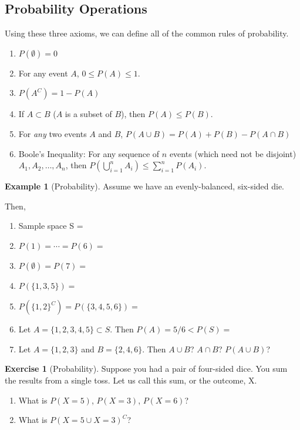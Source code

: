 \documentclass[
]{book}
\providecommand{\tightlist}{%
  \setlength{\itemsep}{0pt}\setlength{\parskip}{0pt}}
\theoremstyle{definition}
\theoremstyle{definition}
\newtheorem{example}{Example}[chapter]
\theoremstyle{definition}
\newtheorem{exercise}{Exercise}[chapter]
\theoremstyle{definition}
\theoremstyle{remark}
\begin{document}
\hypertarget{probability-operations}{%
\subsection*{Probability Operations}\label{probability-operations}}

Using these three axioms, we can define all of the common rules of probability.

\begin{enumerate}
\def\labelenumi{\arabic{enumi}.}
\tightlist
\item
  \(P(\emptyset)=0\)
\item
  For any event \(A\), \(0\le P(A) \le 1\).
\item
  \(P({A}^C)=1-P(A)\)
\item
  If \(A\subset B\) (\(A\) is a subset of \(B\)), then \(P(A)\le P(B)\).
\item
  For \emph{any} two events \(A\) and \(B\), \(P(A\cup B)=P(A)+P(B)-P(A\cap B)\)
\item
  Boole's Inequality: For any sequence of \(n\) events (which need not be disjoint) \(A_1,A_2,\ldots,A_n\), then \(P\left( \bigcup\limits_{i=1}^n A_i\right) \leq \sum\limits_{i=1}^n P(A_i)\).
\end{enumerate}

\begin{example}[Probability]
\protect\hypertarget{exm:prob}{}{\label{exm:prob} {} }
Assume we have an evenly-balanced, six-sided die.

Then,

\begin{enumerate}
\def\labelenumi{\arabic{enumi}.}
\tightlist
\item
  Sample space S =
\item
  \(P(1)=\cdots=P(6)=\)
\item
  \(P(\emptyset)=P(7)=\)
\item
  \(P\left( \{ 1, 3, 5 \} \right)=\)
\item
  \(P\left( \{ 1, 2 \}^C \right)= P\left( \{ 3, 4, 5, 6 \}\right)=\)
\item
  Let \(A=\{ 1,2,3,4,5 \}\subset S\). Then \(P(A)=5/6<P(S)=\)
\item
  Let \(A=\{ 1, 2, 3 \}\) and \(B=\{ 2, 4, 6 \}\). Then \(A\cup B\)? \(A\cap B\)? \(P(A \cup B)\)?
\end{enumerate}
\end{example}

\begin{exercise}[Probability]
\protect\hypertarget{exr:prob1}{}{\label{exr:prob1} {} }
Suppose you had a pair of four-sided dice. You sum the results from a single toss. Let us call this sum, or the outcome, X.

\begin{enumerate}
\def\labelenumi{\arabic{enumi}.}
\item
  What is \(P(X = 5)\), \(P(X = 3)\), \(P(X = 6)\)?
\item
  What is \(P(X=5 \cup X = 3)^C\)?
\end{enumerate}
\end{exercise}
\end{document}
